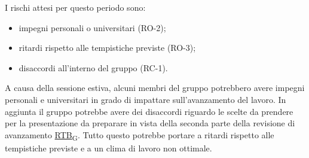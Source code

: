 I rischi attesi per questo periodo sono:
\begin{itemize}
	\item impegni personali o universitari (RO-2);
	\item ritardi rispetto alle tempistiche previste (RO-3);
	\item disaccordi all'interno del gruppo (RC-1).
\end{itemize}
A causa della sessione estiva, alcuni membri del gruppo potrebbero avere impegni personali e universitari in grado di impattare sull'avanzamento del lavoro. In aggiunta il gruppo potrebbe avere dei disaccordi riguardo le scelte da prendere per la presentazione da preparare in vista della seconda parte della revisione di avanzamento \href{https://7last.github.io/docs/pb/documentazione-interna/glossario\#requirements-and-technology-baseline}{RTB\textsubscript{G}}. Tutto questo potrebbe portare a ritardi rispetto alle tempistiche previste e a un clima di lavoro non ottimale.


